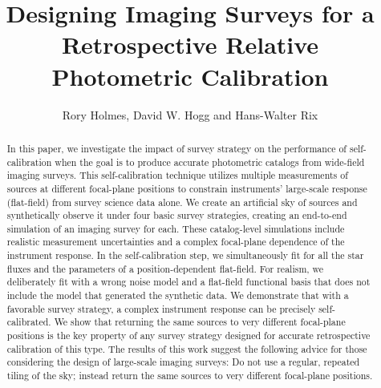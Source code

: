 \documentclass[preprint,pdftex]{aastex}
\begin{document}

\title{Designing Imaging Surveys for a Retrospective Relative Photometric Calibration}


\author{Rory Holmes, David W. Hogg and Hans-Walter Rix}

\begin{abstract}
In this paper, we investigate the impact of survey strategy on the performance of self-calibration when the goal is to produce accurate photometric catalogs
from wide-field imaging surveys. This self-calibration technique utilizes multiple measurements of sources at different focal-plane positions to constrain instruments' large-scale response (flat-field) from survey science data alone. We create an artificial sky of sources
and synthetically observe it under four basic survey strategies,
creating an end-to-end simulation of an imaging survey for each. These
catalog-level simulations include realistic measurement uncertainties
and a complex focal-plane dependence of the instrument response. In the
self-calibration step, we simultaneously fit for all the star fluxes
and the parameters of a position-dependent flat-field.  For realism,
we deliberately fit with a wrong noise model and a flat-field
functional basis that does not include the model that generated the
synthetic data.  We demonstrate that with a favorable survey strategy,
a complex instrument response can be precisely
self-calibrated. We show that returning the same sources to very
different focal-plane positions is the key property of any survey
strategy designed for accurate retrospective calibration of this type. The results
of this work suggest the following advice for those considering the
design of large-scale imaging surveys: Do not use a regular, repeated tiling of
the sky; instead return the same sources to very different focal-plane
positions.
\end{abstract}
\end{document}
